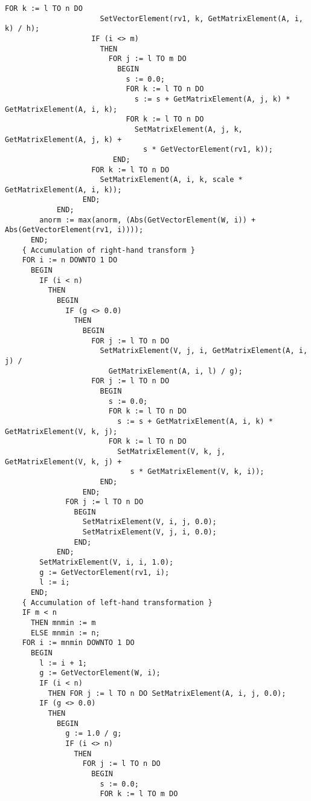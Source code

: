 \begin{lstlisting}[caption=Singular value decomposition]
                    FOR k := l TO n DO
                      SetVectorElement(rv1, k, GetMatrixElement(A, i, k) / h);
                    IF (i <> m)
                      THEN
                        FOR j := l TO m DO
                          BEGIN
                            s := 0.0;
                            FOR k := l TO n DO
                              s := s + GetMatrixElement(A, j, k) * GetMatrixElement(A, i, k);
                            FOR k := l TO n DO
                              SetMatrixElement(A, j, k, GetMatrixElement(A, j, k) +
                                s * GetVectorElement(rv1, k));
                         END;
                    FOR k := l TO n DO
                      SetMatrixElement(A, i, k, scale * GetMatrixElement(A, i, k));
                  END;
            END;
        anorm := max(anorm, (Abs(GetVectorElement(W, i)) + Abs(GetVectorElement(rv1, i))));
      END;
    { Accumulation of right-hand transform }
    FOR i := n DOWNTO 1 DO
      BEGIN
        IF (i < n)
          THEN
            BEGIN
              IF (g <> 0.0)
                THEN
                  BEGIN
                    FOR j := l TO n DO
                      SetMatrixElement(V, j, i, GetMatrixElement(A, i, j) /
                        GetMatrixElement(A, i, l) / g);
                    FOR j := l TO n DO
                      BEGIN
                        s := 0.0;
                        FOR k := l TO n DO
                          s := s + GetMatrixElement(A, i, k) * GetMatrixElement(V, k, j);
                        FOR k := l TO n DO
                          SetMatrixElement(V, k, j, GetMatrixElement(V, k, j) +
                             s * GetMatrixElement(V, k, i));
                      END;
                  END;
              FOR j := l TO n DO
                BEGIN
                  SetMatrixElement(V, i, j, 0.0);
                  SetMatrixElement(V, j, i, 0.0);
                END;
            END;
        SetMatrixElement(V, i, i, 1.0);
        g := GetVectorElement(rv1, i);
        l := i;
      END;
    { Accumulation of left-hand transformation }
    IF m < n
      THEN mnmin := m
      ELSE mnmin := n;
    FOR i := mnmin DOWNTO 1 DO
      BEGIN
        l := i + 1;
        g := GetVectorElement(W, i);
        IF (i < n)
          THEN FOR j := l TO n DO SetMatrixElement(A, i, j, 0.0);
        IF (g <> 0.0)
          THEN
            BEGIN
              g := 1.0 / g;
              IF (i <> n)
                THEN
                  FOR j := l TO n DO
                    BEGIN
                      s := 0.0;
                      FOR k := l TO m DO

\end{lstlisting}
